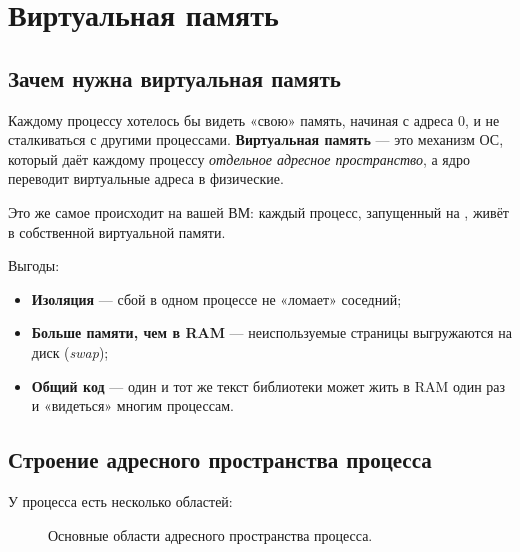 \chapter{Виртуальная память}
\label{ch:16-virtual-memory}

\section{Зачем нужна виртуальная память}

Каждому процессу хотелось бы видеть «свою» память, начиная
с адреса 0, и не сталкиваться с другими процессами.
\textbf{Виртуальная память} --- это механизм ОС, который
даёт каждому процессу \emph{отдельное адресное пространство},
а ядро переводит виртуальные адреса в физические.

Это же самое происходит на вашей ВМ: каждый процесс,
запущенный на , живёт в собственной
виртуальной памяти.

Выгоды:
\begin{itemize}
  \item \textbf{Изоляция} --- сбой в одном процессе не
    «ломает» соседний;
  \item \textbf{Больше памяти, чем в RAM} --- неиспользуемые
    страницы выгружаются на диск (\emph{swap});
  \item \textbf{Общий код} --- один и тот же текст библиотеки
    может жить в RAM один раз и «видеться» многим процессам.
\end{itemize}

\section{Строение адресного пространства процесса}

У процесса есть несколько областей:

\begin{figure}[htb]
  \centering
  \caption{Основные области адресного пространства процесса.}
  \label{fig:mem-layout}
\end{figure}

